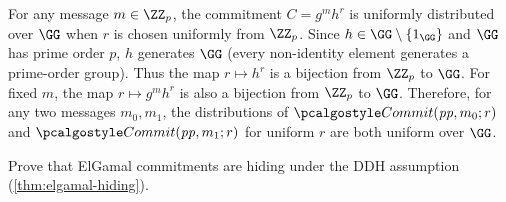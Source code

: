 \ifsolutions
\begin{mysolution}
  For any message $m \in \ZZ_p$, the commitment $C = g^m h^r$ is uniformly distributed over $\GG$ when $r$ is chosen uniformly from $\ZZ_p$.
  Since $h \in \GG \setminus \{1_\GG\}$ and $\GG$ has prime order $p$, $h$ generates $\GG$ (every non-identity element generates a prime-order group).
  Thus the map $r \mapsto h^r$ is a bijection from $\ZZ_p$ to $\GG$.
  For fixed $m$, the map $r \mapsto g^m h^r$ is also a bijection from $\ZZ_p$ to $\GG$.
  Therefore, for any two messages $m_0, m_1$, the distributions of $\algo{Commit}(\params, m_0; r)$ and $\algo{Commit}(\params, m_1; r)$ for uniform $r$ are both uniform over $\GG$.
\end{mysolution}
\fi

\begin{exercise}\label{ex:elgamal-hiding}
  Prove that ElGamal commitments are hiding under the DDH assumption (\autoref{thm:elgamal-hiding}).
\end{exercise}

